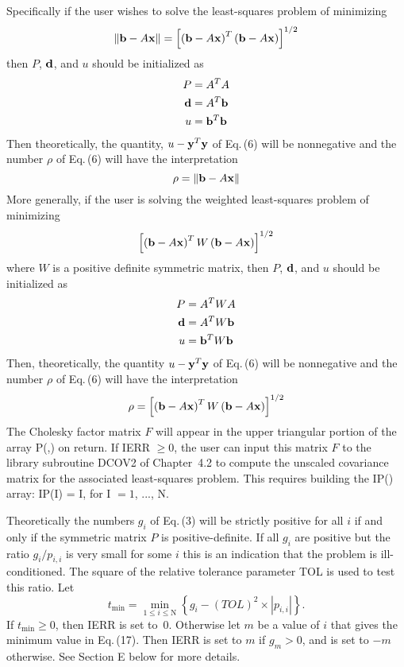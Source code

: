 \documentclass[twoside]{MATH77}
\begin{document}
Specifically if the user wishes to solve the least-squares problem of
minimizing
\begin{equation}
\label{O7}\left\| {\bf b}-A{\bf x}\right\| =\left[ \left( {\bf b}-A{\bf x}%
\right) ^T\left( {\bf b}-A{\bf x}\right) \right] ^{1/2}
\end{equation}
then $P$, ${\bf d}$, and $u$ should be initialized as
\begin{align}
\label{O8}P&=A^TA\\
\label{O9}{\bf d}&=A^T{\bf b}\\
\label{O10}u&={\bf b}^T{\bf b}
\end{align}
Then theoretically, the quantity, $u-{\bf y}^T{\bf y}$ of Eq.\,(6) will be
nonnegative and the number $\rho $ of Eq.\,(6) will have the interpretation
\begin{equation}
\label{O11}\rho =\left\| {\bf b}-A{\bf x}\right\|
\end{equation}
More generally, if the user is solving the weighted least-squares problem of
minimizing
\begin{equation}
\label{O12}\left[ \left( {\bf b}-A{\bf x}\right) ^TW\left( {\bf b}-A{\bf x}%
\right) \right] ^{1/2}
\end{equation}
where $W$ is a positive definite symmetric matrix, then $P$, ${\bf d}$, and $%
u$ should be initialized as
\begin{align}
\label{O13}P&=A^TWA\\
\label{O14}{\bf d}&=A^TW{\bf b}\\
\label{O15}u&={\bf b}^TW{\bf b}
\end{align}
Then, theoretically, the quantity $u-{\bf y}^T{\bf y}$ of Eq.\,(6) will be
nonnegative and the number $\rho $ of Eq.\,(6) will have the interpretation
\begin{equation}
\label{O16}\rho =\left[ \left( {\bf b}-A{\bf x}\right) ^TW\left( {\bf b}-A%
{\bf x}\right) \right] ^{1/2}
\end{equation}
The Cholesky factor matrix $F$ will appear in the upper triangular portion
of the array P(,) on return. If IERR $\geq 0$, the user can input this
matrix $F$ to the library subroutine DCOV2 of Chapter~4.2 to compute the
unscaled covariance matrix for the associated least-squares problem. This
requires building the IP() array: IP(I) = I, for I $=1$, ..., N.

Theoretically the numbers $g_i$ of Eq.\,(3) will be strictly positive for all
$i$ if and only if the symmetric matrix $P$ is positive-definite. If all $%
g_i $ are positive but the ratio $g_i/p_{i,i}$ is very small for some $i$
this is an indication that the problem is ill-conditioned. The square of the
relative tolerance parameter TOL is used to test this ratio. Let
\begin{equation}
\label{o17}t_{\min }=\min _{1\leq i\leq \text{N}}\left\{ g_i-(TOL)^2\times
|p_{i,i}|\right\} .
\end{equation}
If $t_{\min }\geq 0$, then IERR is set to~0. Otherwise let $m$ be a value of
$i$ that gives the minimum value in Eq.\,(17). Then IERR is set to $m$ if $%
g_m>0$, and is set to $-m$ otherwise. See Section E below for more details.
\end{document}
